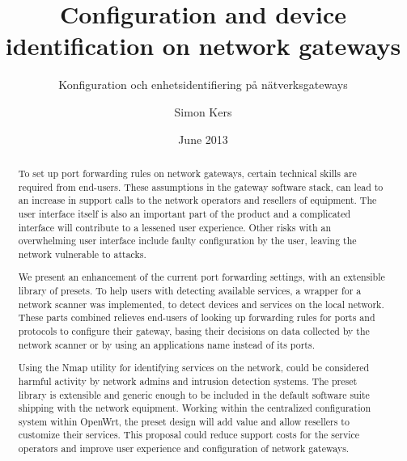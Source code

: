 \documentclass[g5paper,11pt]{kth-bcs}
\date{June 2013}
\title{Configuration and device identification on network gateways}
\subtitle{Konfiguration och enhetsidentifiering på nätverksgateways}
\author{Simon Kers}
\newcommand\blankpage{%
    \null
    \thispagestyle{empty}%
    \addtocounter{page}{-1}%
    \newpage}
\begin{document}
\frontmatter
{}
\setcounter{page}{1}
\pagestyle{center}

\maketitle
\thispagestyle{center}
\begin{abstract}
To set up port forwarding rules on network gateways, certain technical skills are required from end-users.
These assumptions in the gateway software stack, can lead to an increase in support calls to the network operators and resellers of equipment.
The user interface itself is also an important part of the product and a complicated interface will contribute to a lessened user experience.
Other risks with an overwhelming user interface include faulty configuration by the user, leaving the network vulnerable to attacks.


We present an enhancement of the current port forwarding settings, with an extensible library of presets.
To help users with detecting available services, a wrapper for a network scanner was implemented, to detect devices and services on the local network.
These parts combined relieves end-users of looking up forwarding rules for ports and protocols to configure their gateway, basing their decisions on data collected by the network scanner or by using an applications name instead of its ports.

Using the Nmap utility for identifying services on the network, could be considered harmful activity by network admins and intrusion detection systems.
The preset library is extensible and generic enough to be included in the default software suite shipping with the network equipment.
Working within the centralized configuration system within OpenWrt, the preset design will add value and allow resellers to customize their services.
This proposal could reduce support costs for the service operators and improve user experience and configuration of network gateways.

\end{abstract}
\newpage
\blankpage
\end{document}
